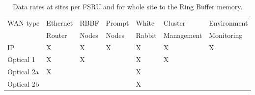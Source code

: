 \begin{table}[h!]
\centering
\begin{tabular}{l|llllll}
{WAN type} & {Ethernet} & {RBBF} & {Prompt} & {White} & {Cluster} & {Environment} \\
           & Router & Nodes & Nodes & Rabbit & Management & Monitoring \\ \hline
IP         & X & X & X & X & X & X \\
Optical 1  & X & X & & X & X & \\
Optical 2a & X & & & X & & \\
Optical 2b &   & & & X & & \\
\end{tabular}
\caption{Data rates at \ED sites per FSRU and for whole site to the Ring Buffer memory.
\label{tab:site-computing}}
\end{table}